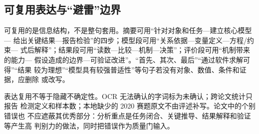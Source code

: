 \subsection{可复用表达与“避雷”边界}

可复用的是信息结构，不是整句套用。摘要可用“针对对象和任务—建立核心模型—
给出关键结果—报告检验”的四步；模型段可用“关系依据—变量定义—方程/约束—
式后解释”；结果段可用“读数—比较—机制—决策”；评价段可用“机制带来的能力—
假设造成的边界—可验证改进”。“首先、其次、最后”“通过软件求解可得”“结果
较为理想”“模型具有较强普适性”等句子若没有对象、数值、条件和证据，应删除
或改写。

表达复用不等于隐藏不确定性。OCR 无法确认的字词标为未确认；跨论文统计只报告
检测定义和样本数；本地缺少的 2020 赛题原文不由评述补写。论文中的个别错误也
不应遮蔽其优秀部分：分析重点是任务闭合、关键推导、结果解释和验证等产生高
判别力的做法，同时把错误作为质量门输入。

